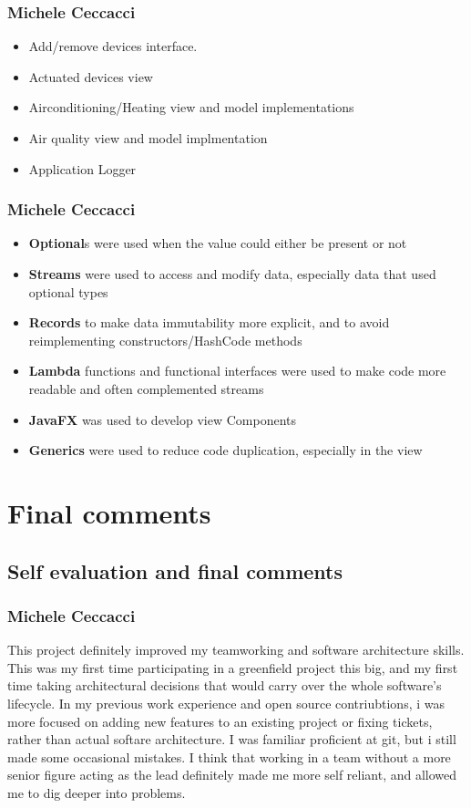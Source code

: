 \documentclass[a4paper,12pt]{report}
\begin{document}
\subsection{Michele Ceccacci}
\begin{itemize}
	\item Add/remove devices interface.
	\item Actuated devices view
	\item Airconditioning/Heating view and model implementations
	\item Air quality view and model implmentation
	\item Application Logger 
\end{itemize}

\subsection{Michele Ceccacci}
\begin{itemize}
	\item \textbf{Optional}s were used when the value could either be present or not
	\item \textbf{Streams} were used to access and modify data, especially data that used optional types
	\item \textbf{Records} to make data immutability more explicit, and to avoid reimplementing constructors/HashCode methods
	\item \textbf{Lambda} functions and functional interfaces were used to make code more readable and often complemented streams 
	\item \textbf{JavaFX} was used to develop view Components
	\item \textbf{Generics} were used to reduce code duplication, especially in the view
\end{itemize}

\chapter{Final comments}

\section{Self evaluation and final comments}

\subsection{Michele Ceccacci}
This project definitely improved my teamworking and software architecture skills. 
This was my first time participating in a greenfield project this big, and my first time 
taking architectural decisions that would carry over the whole software's lifecycle. 
In my previous work experience and open source contriubtions, i was more focused on  adding new features 
to an existing project or fixing tickets, rather than actual softare architecture. 
I was familiar proficient at git, but i still made some occasional mistakes.
I think that working in a team without a more senior figure acting as the  lead definitely 
made me more  self reliant, and allowed me to dig deeper into problems.
\end{document}
